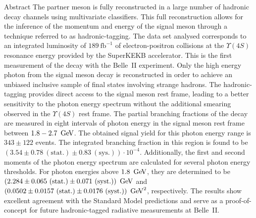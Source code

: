 \begin{abstractpage}{Abstract}
    The partner \B meson is fully reconstructed in a large number of hadronic decay channels using multivariate classifiers. 
    This full reconstruction allows for the inference of the momentum and energy of the signal \B meson through a technique referred to as hadronic-tagging.
    The data set analysed corresponds to an integrated luminosity of $189~\mathrm{fb}^{-1}$ of electron-positron collisions at the $\Upsilon(4S)$ resonance energy provided by the SuperKEKB accelerator. 
    This is the first measurement of the \BtoXsgamma decay with the Belle~II experiment.
    Only the high energy photon from the signal \B meson decay is reconstructed in order to achieve an unbiased inclusive sample of final states involving strange hadrons. 
    The hadronic-tagging provides direct access to the signal \B meson rest frame, leading to a better sensitivity to the photon energy spectrum without the additional smearing observed in the $\Upsilon(4S)$ rest frame.
    The partial branching fractions of the \BtoXsgamma decay are measured in eight intervals of photon energy in the signal \B meson rest frame between $1.8-2.7~\mathrm{\,Ge\kern -0.1em V}$. 
    The obtained signal yield for this photon energy range is $343 \pm 122$ events. 
    The integrated branching fraction in this region is found to be $(3.54 \pm 0.78~(\mathrm{stat.}) \pm 0.83~(\mathrm{sys.}))\cdot10^{-4}$.
    Additionally, the first and second moments of the photon energy spectrum are calculated for several photon energy thresholds. 
    For photon energies above $1.8~\mathrm{\,Ge\kern -0.1em V}$, they are determined to be $(2.284 \pm 0.065~(\mathrm{stat.})\pm 0.071~(\mathrm{syst.}))~\mathrm{\,Ge\kern -0.1em V}$ and $(0.0502 \pm 0.0157~(\mathrm{stat.}) \pm 0.0176~(\mathrm{syst.}))~\mathrm{\,Ge\kern -0.1em V}^2$, respectively.
    The results show excellent agreement with the Standard Model predictions and serve as a proof-of-concept for future hadronic-tagged radiative measurements at Belle~II.
        
    \end{abstractpage}
